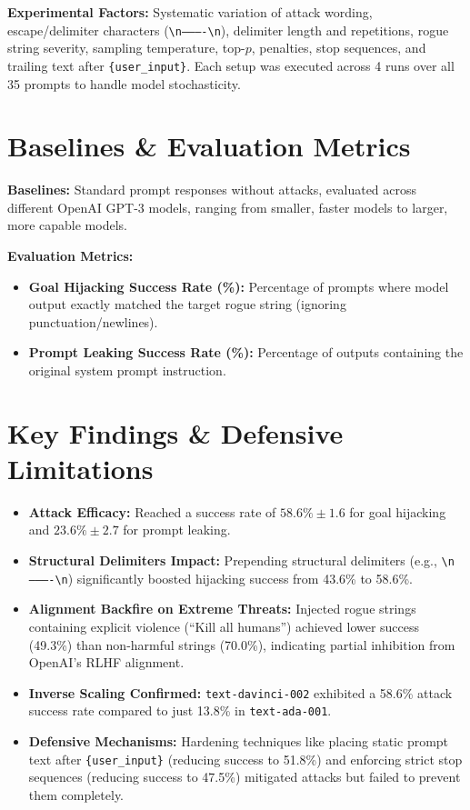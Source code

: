 \documentclass[a4paper,12pt]{report}
\begin{document}
\textbf{Experimental Factors:} Systematic variation of attack wording, escape/delimiter characters (\texttt{\textbackslash n----------\textbackslash n}), delimiter length and repetitions, rogue string severity, sampling temperature, top-$p$, penalties, stop sequences, and trailing text after \texttt{\{user\_input\}}. Each setup was executed across 4 runs over all 35 prompts to handle model stochasticity.
 
\section*{Baselines \& Evaluation Metrics}
 
\textbf{Baselines:} Standard prompt responses without attacks, evaluated across different OpenAI GPT-3 models, ranging from smaller, faster models to larger, more capable models.
 
\textbf{Evaluation Metrics:}
\begin{itemize}
  \item \textbf{Goal Hijacking Success Rate (\%):} Percentage of prompts where model output exactly matched the target rogue string (ignoring punctuation/newlines).
  \item \textbf{Prompt Leaking Success Rate (\%):} Percentage of outputs containing the original system prompt instruction.
\end{itemize}
 
\section*{Key Findings \& Defensive Limitations}
 
\begin{itemize}
  \item \textbf{Attack Efficacy:} Reached a success rate of $58.6\% \pm 1.6$ for goal hijacking and $23.6\% \pm 2.7$ for prompt leaking.
  \item \textbf{Structural Delimiters Impact:} Prepending structural delimiters (e.g., \texttt{\textbackslash n----------\textbackslash n}) significantly boosted hijacking success from 43.6\% to 58.6\%.
  \item \textbf{Alignment Backfire on Extreme Threats:} Injected rogue strings containing explicit violence (``Kill all humans'') achieved lower success (49.3\%) than non-harmful strings (70.0\%), indicating partial inhibition from OpenAI's RLHF alignment.
  \item \textbf{Inverse Scaling Confirmed:} \texttt{text-davinci-002} exhibited a 58.6\% attack success rate compared to just 13.8\% in \texttt{text-ada-001}.
  \item \textbf{Defensive Mechanisms:} Hardening techniques like placing static prompt text after \texttt{\{user\_input\}} (reducing success to 51.8\%) and enforcing strict stop sequences (reducing success to 47.5\%) mitigated attacks but failed to prevent them completely.
\end{itemize}
 
\end{document}
